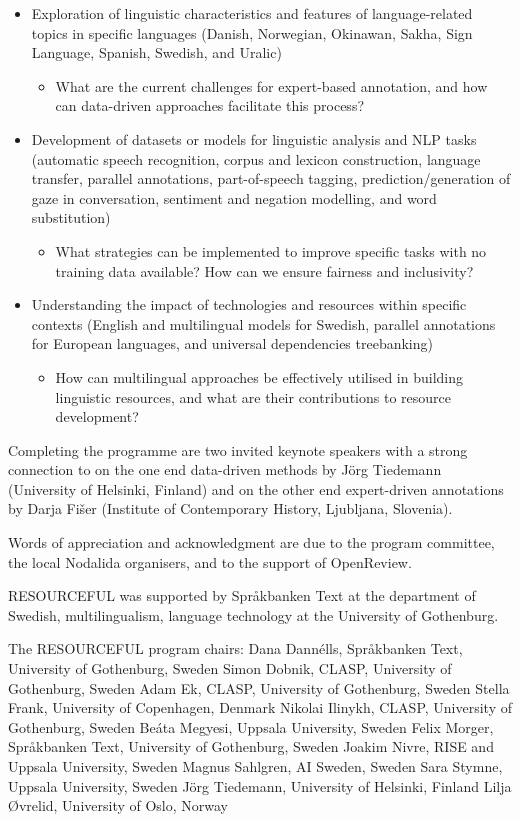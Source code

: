 \begin{itemize}
    \item Exploration of linguistic characteristics and features of language-related topics in specific languages (Danish, Norwegian, Okinawan, Sakha, Sign Language, Spanish, Swedish, and Uralic)
    \begin{itemize}
        \item What are the current challenges for expert-based annotation, and how can data-driven approaches facilitate this process?
    \end{itemize}
    \item Development of datasets or models for linguistic analysis and NLP tasks (automatic speech recognition, corpus and lexicon construction, language transfer, parallel annotations, part-of-speech tagging, prediction/generation of gaze in conversation, sentiment and negation modelling, and word substitution)
    \begin{itemize}
        \item What strategies can be implemented to improve specific tasks with no training data available? How can we ensure fairness and inclusivity?
    \end{itemize}
    \item Understanding the impact of technologies and resources within specific contexts (English and multilingual models for Swedish, parallel annotations for European languages, and universal dependencies treebanking) 
    \begin{itemize}
        \item How can multilingual approaches be effectively utilised in building linguistic resources, and what are their contributions to resource development?
    \end{itemize}    
\end{itemize}

Completing the programme are two invited keynote speakers with a strong connection to on the one end data-driven methods by Jörg Tiedemann (University of Helsinki, Finland) and on the other end expert-driven annotations by Darja Fišer (Institute of Contemporary History, Ljubljana, Slovenia).  

Words of appreciation and acknowledgment are due to the program committee, the local Nodalida organisers, and to the support of OpenReview. 

RESOURCEFUL was supported by Språkbanken Text at the department of Swedish, multilingualism, language technology at the University of Gothenburg. 

The RESOURCEFUL program chairs: 
Dana Dannélls, Språkbanken Text, University of Gothenburg, Sweden
Simon Dobnik, CLASP, University of Gothenburg, Sweden
Adam Ek, CLASP, University of Gothenburg, Sweden
Stella Frank, University of Copenhagen, Denmark 
Nikolai Ilinykh, CLASP, University of Gothenburg, Sweden
Beáta Megyesi, Uppsala University, Sweden
Felix Morger, Språkbanken Text, University of Gothenburg, Sweden
Joakim Nivre, RISE and Uppsala University, Sweden
Magnus Sahlgren, AI Sweden, Sweden
Sara Stymne, Uppsala University, Sweden
Jörg Tiedemann, University of Helsinki, Finland
Lilja Øvrelid, University of Oslo, Norway 
